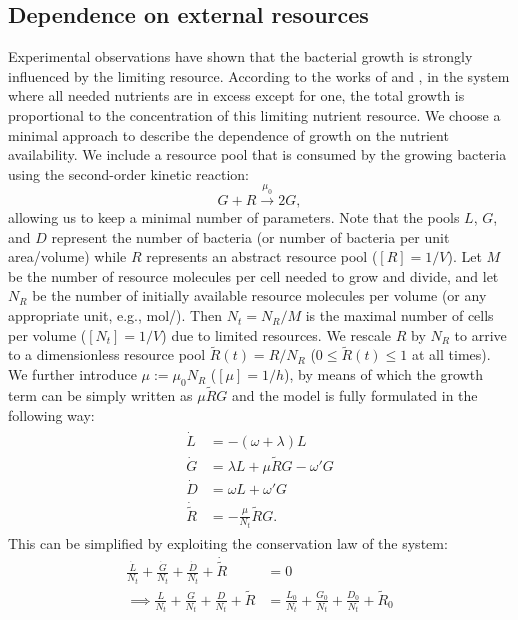 \documentclass[10pt,1p,authoryear]{elsarticle}
\numberwithin{equation}{section}
\begin{document}
\subsection{Dependence on external resources}
Experimental observations have shown that the bacterial growth is strongly influenced by the limiting resource.
According to the works of \citet{monod_growth_1949} and \citet{vanimpeNovelClass2005}, in the system where all needed nutrients are in excess except for one, the total growth is proportional to the concentration of this limiting nutrient resource.
We choose a minimal approach to describe the dependence of growth on the nutrient availability.
We include a resource pool that is consumed by the growing bacteria using the second-order kinetic reaction:
\begin{equation}
    G + R  \stackrel{\mu_0}{\longrightarrow} 2G,
\end{equation}
allowing us to keep a minimal number of parameters.
Note that the pools $L$, $G$, and $D$ represent the number of bacteria (or number of bacteria per unit area/volume) while $R$ represents an abstract resource pool ($[R]=1/V$). Let $M$ be the number of resource molecules per cell needed to grow and divide, and let $N_R$ be the number of initially available resource molecules per volume (or any appropriate unit, e.g., \unit{mol/\ell}).
Then $N_t=N_R/M$ is the maximal number of cells per volume ($[N_t]=1/V$) due to limited resources. We rescale $R$ by $N_R$ to arrive to a dimensionless resource pool $\tilde{R}(t) = R/N_R$ ($0 \leqslant \tilde{R}(t) \leqslant 1$ at all times). We further introduce $\mu:=\mu_0 N_R$ ($[\mu]= 1/h$), by means of which the growth term can be simply written as $\mu\tilde{R}G$ and the model is fully formulated in the following way:
\begin{align}
    \begin{split}
        \dot{L} &= -(\omega + \lambda) L\\
        \dot{G} &= \lambda L + \mu \tilde{R} G-\omega' G\\
        \dot{D} &= \omega  L + \omega' G\\
        \dot{\tilde{R}} &= - \frac{\mu}{N_t} \tilde{R} G.
    \end{split}
\label{eq:ode_3pool_resource}
\end{align}
%
This can be simplified by exploiting the conservation law of the system:
\begin{align}
\frac{\dot{L}}{N_t}+\frac{\dot{G}}{N_t}+\frac{\dot{D}}{N_t}+\dot{\tilde{R}}&=0\\
\implies\frac{L}{N_t}+\frac{G}{N_t}+\frac{D}{N_t}+\tilde{R}&=\frac{L_0}{N_t}+\frac{G_0}{N_t}+\frac{D_0}{N_t}+\tilde{R}_0
\end{align}
\end{document}
